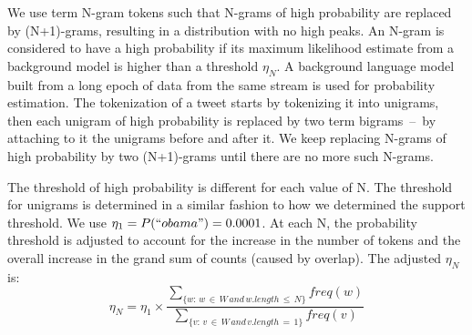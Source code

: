 \documentclass[letterpaper,12pt,titlepage,oneside,final]{book}
\begin{document}
We use term N-gram tokens such that N-grams of high probability are replaced by
(N+1)-grams, resulting in a distribution with no high peaks.  
An N-gram is considered to %
have a high probability if its maximum likelihood estimate from a background
model is higher than a threshold $\eta_N$. 
A background language model built from a long epoch of data 
from the same stream is used for probability estimation.
The tokenization of a tweet starts by tokenizing it into unigrams, then each
unigram of high probability is replaced by two term bigrams~--~by
attaching to it the unigrams before and after it.
We keep replacing N-grams of high probability by two (N+1)-grams 
until there are no more such N-grams. %


The threshold of high probability is different for each value of N. 
The threshold for unigrams is determined in a similar fashion to how
we determined the support threshold. We use $\eta_1 = P(``obama") = 0.0001$.
At each N, the probability threshold is adjusted to account for the increase
in the number of tokens and the overall increase in the grand sum of counts (caused by overlap).
The adjusted $\eta_N$ is:
\begin{equation}\eta_N = \eta_1 \times \frac{\sum_{\{w:\, w \,\in\, W\, and\, w.length \,\le\, N\}}{freq(w)}}{\sum_{\{v:\, v\, \in\, W \,and \,v.length\,=\,1\}}{freq(v)}}\end{equation}
\end{document}
